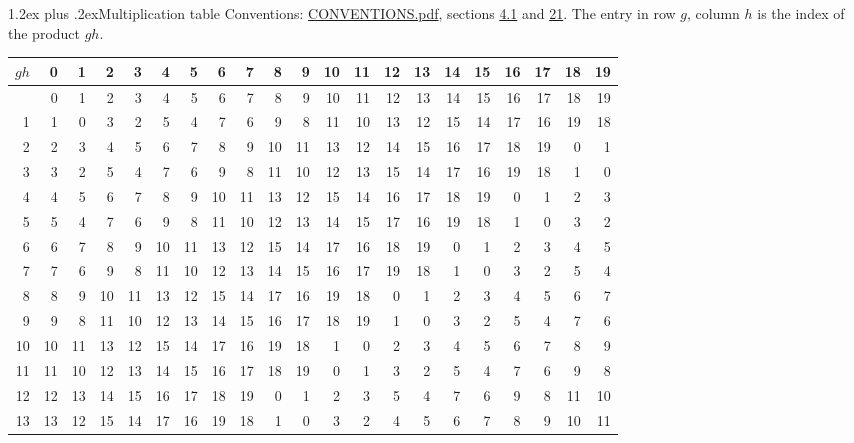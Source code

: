 \documentclass[10pt,a4paper]{article}
\makeatletter
\renewcommand\section{\@startsection{section}{1}{\z@}{-3ex plus -1ex minus -.2ex}%
  {1.2ex plus .2ex}{\normalfont\large\sffamily\bfseries\color{parttitle}}}
\numberwithin{equation}{section}
\makeatother
\begin{document}
\section{Multiplication table}\label{s:multiplication}
Conventions: \href{../../CONVENTIONS.pdf}{CONVENTIONS.pdf}, sections \href{../../../rotation/CONVENTIONS.pdf\#conv.4.1}{4.1} and \href{../../CONVENTIONS.pdf\#conv.21}{21}.
The entry in row $g$, column $h$ is the index of the product $gh$.
{\normalsize\setlength{\tabcolsep}{0.1em}\setlength{\LTleft}{-8pt plus 1fill}\setlength{\LTright}{-8pt plus 1fill}\begin{longtable}{@{}r|rrrrrrrrrrrrrrrrrrrr@{}}\toprule
$gh$ & 0 & 1 & 2 & 3 & 4 & 5 & 6 & 7 & 8 & 9 & 10 & 11 & 12 & 13 & 14 & 15 & 16 & 17 & 18 & 19\\\midrule\endhead
\bottomrule\endfoot\endlastfoot
0 & 0 & 1 & 2 & 3 & 4 & 5 & 6 & 7 & 8 & 9 & 10 & 11 & 12 & 13 & 14 & 15 & 16 & 17 & 18 & 19\\*
1 & 1 & 0 & 3 & 2 & 5 & 4 & 7 & 6 & 9 & 8 & 11 & 10 & 13 & 12 & 15 & 14 & 17 & 16 & 19 & 18\\
2 & 2 & 3 & 4 & 5 & 6 & 7 & 8 & 9 & 10 & 11 & 13 & 12 & 14 & 15 & 16 & 17 & 18 & 19 & 0 & 1\\
3 & 3 & 2 & 5 & 4 & 7 & 6 & 9 & 8 & 11 & 10 & 12 & 13 & 15 & 14 & 17 & 16 & 19 & 18 & 1 & 0\\
4 & 4 & 5 & 6 & 7 & 8 & 9 & 10 & 11 & 13 & 12 & 15 & 14 & 16 & 17 & 18 & 19 & 0 & 1 & 2 & 3\\
5 & 5 & 4 & 7 & 6 & 9 & 8 & 11 & 10 & 12 & 13 & 14 & 15 & 17 & 16 & 19 & 18 & 1 & 0 & 3 & 2\\
6 & 6 & 7 & 8 & 9 & 10 & 11 & 13 & 12 & 15 & 14 & 17 & 16 & 18 & 19 & 0 & 1 & 2 & 3 & 4 & 5\\
7 & 7 & 6 & 9 & 8 & 11 & 10 & 12 & 13 & 14 & 15 & 16 & 17 & 19 & 18 & 1 & 0 & 3 & 2 & 5 & 4\\
8 & 8 & 9 & 10 & 11 & 13 & 12 & 15 & 14 & 17 & 16 & 19 & 18 & 0 & 1 & 2 & 3 & 4 & 5 & 6 & 7\\
9 & 9 & 8 & 11 & 10 & 12 & 13 & 14 & 15 & 16 & 17 & 18 & 19 & 1 & 0 & 3 & 2 & 5 & 4 & 7 & 6\\
10 & 10 & 11 & 13 & 12 & 15 & 14 & 17 & 16 & 19 & 18 & 1 & 0 & 2 & 3 & 4 & 5 & 6 & 7 & 8 & 9\\
11 & 11 & 10 & 12 & 13 & 14 & 15 & 16 & 17 & 18 & 19 & 0 & 1 & 3 & 2 & 5 & 4 & 7 & 6 & 9 & 8\\
12 & 12 & 13 & 14 & 15 & 16 & 17 & 18 & 19 & 0 & 1 & 2 & 3 & 5 & 4 & 7 & 6 & 9 & 8 & 11 & 10\\
13 & 13 & 12 & 15 & 14 & 17 & 16 & 19 & 18 & 1 & 0 & 3 & 2 & 4 & 5 & 6 & 7 & 8 & 9 & 10 & 11\\

\end{longtable}}
\end{document}
